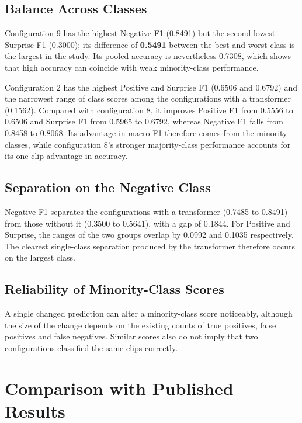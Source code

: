 \subsection{Balance Across Classes}
\label{sec:config9-imbalanced}
\label{sec:config2-balanced}

Configuration 9 has the highest Negative F1 (0.8491) but the second-lowest Surprise F1 (0.3000); its difference of \textbf{0.5491} between the best and worst class is the largest in the study. Its pooled accuracy is nevertheless 0.7308, which shows that high accuracy can coincide with weak minority-class performance.

Configuration 2 has the highest Positive and Surprise F1 (0.6506 and 0.6792) and the narrowest range of class scores among the configurations with a transformer (0.1562). Compared with configuration 8, it improves Positive F1 from 0.5556 to 0.6506 and Surprise F1 from 0.5965 to 0.6792, whereas Negative F1 falls from 0.8458 to 0.8068. Its advantage in macro F1 therefore comes from the minority classes, while configuration 8's stronger majority-class performance accounts for its one-clip advantage in accuracy.

\subsection{Separation on the Negative Class}
\label{sec:negative-tracks-split}

Negative F1 separates the configurations with a transformer (0.7485 to 0.8491) from those without it (0.3500 to 0.5641), with a gap of 0.1844. For Positive and Surprise, the ranges of the two groups overlap by 0.0992 and 0.1035 respectively. The clearest single-class separation produced by the transformer therefore occurs on the largest class.

\subsection{Reliability of Minority-Class Scores}
\label{sec:minority-caution}

A single changed prediction can alter a minority-class score noticeably, although the size of the change depends on the existing counts of true positives, false positives and false negatives. Similar scores also do not imply that two configurations classified the same clips correctly.


\section{Comparison with Published Results}
\label{sec:literature-comparison}

